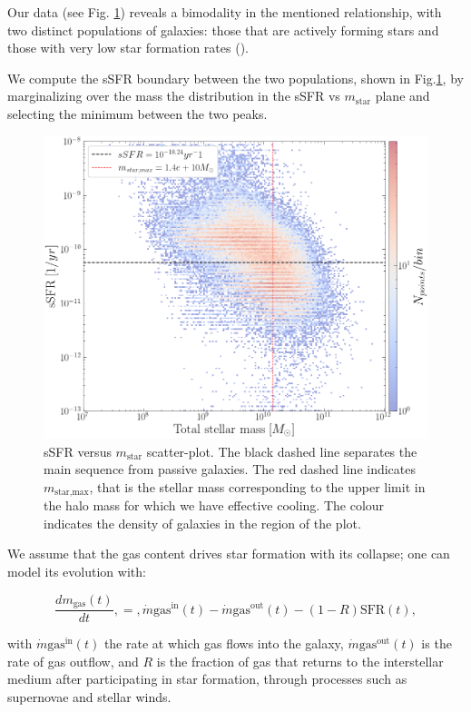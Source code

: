 \documentclass[fleqn,usenatbib]{mnras}
\begin{document}
Our data (see Fig. \ref{fig:sSFR_mass}) reveals a bimodality in the mentioned relationship, with two distinct populations of galaxies: those that are actively forming stars and those with very low star formation rates (\cite{kauffmann_dependence_2003}).

We compute the sSFR boundary between the two populations, shown in Fig.\ref{fig:sSFR_mass}, by marginalizing over the mass the distribution in the sSFR vs $m_\text{star}$ plane and selecting the minimum between the two peaks.

\begin{figure}\centering
	\includegraphics[width=0.86\columnwidth]{images/sSFRvsmstar.png}
    \caption{sSFR versus $m_\text{star}$ scatter-plot. The black dashed line separates the main sequence from passive galaxies. The red dashed line indicates $m_\text{star,max}$, that is the stellar mass corresponding to the upper limit in the halo mass for which we have effective cooling. The colour indicates the density of galaxies in the region of the plot.}
    \label{fig:sSFR_mass}
\end{figure}


We assume that the gas content drives star formation with its collapse; one can model its evolution with:


\begin{equation}
\dfrac{dm_\text{gas}(t)}{dt} , = , \dot{m}\text{gas}^\text{in}(t) - \dot{m}\text{gas}^\text{out}(t) - \left(1-R\right)\text{SFR}(t),
\label{eq:dmgas_dt_old}
\end{equation}


with $\dot{m}\text{gas}^\text{in}(t)$  the rate at which gas flows into the galaxy, $\dot{m}\text{gas}^\text{out}(t)$ is the rate of gas outflow, and $R$ is the fraction of gas that returns to the interstellar medium after participating in star formation, through processes such as supernovae and stellar winds.\\
\end{document}
